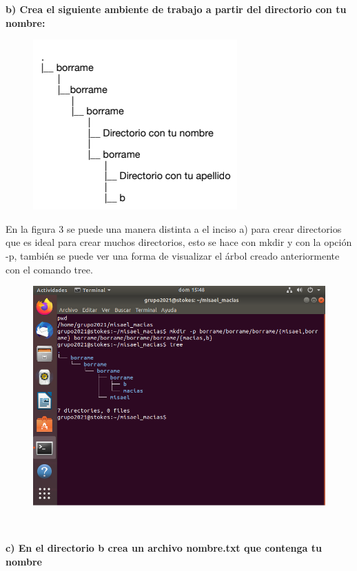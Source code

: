 \documentclass[12pt,a4paper]{article}
\begin{document}
\noindent \textbf{b) Crea el siguiente ambiente de trabajo a partir del directorio con tu nombre:}


\begin{figure}[h!]
    \includegraphics[scale = 0.9]{b.dir.png}
\end{figure}

\noindent En la figura 3 se puede una manera distinta a el inciso a) para crear directorios que es ideal para crear muchos directorios, esto se hace con mkdir y con la opción -p, también se puede ver una forma de visualizar el árbol creado anteriormente con el comando tree.

\begin{figure}[h!]
    \centering
    \includegraphics[scale = 0.5]{b.1.png}
    \caption{}
\end{figure}
\\
\newpage

\noindent \textbf{c) En el directorio b crea un archivo nombre.txt que contenga tu nombre}
\end{document}
